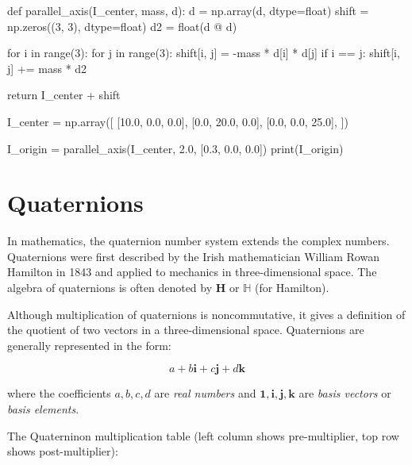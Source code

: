 \begin{python}
def parallel_axis(I_center, mass, d):
    d = np.array(d, dtype=float)
    shift = np.zeros((3, 3), dtype=float)
    d2 = float(d @ d)

    for i in range(3):
        for j in range(3):
            shift[i, j] = -mass * d[i] * d[j]
            if i == j:
                shift[i, j] += mass * d2

    return I_center + shift


I_center = np.array([
    [10.0, 0.0, 0.0],
    [0.0, 20.0, 0.0],
    [0.0, 0.0, 25.0],
])

I_origin = parallel_axis(I_center, 2.0, [0.3, 0.0, 0.0])
print(I_origin)
\end{python}

\section{Quaternions}

In mathematics, the quaternion number system extends the complex numbers.
Quaternions were first described by the Irish mathematician William Rowan
Hamilton in 1843 and applied to mechanics in three-dimensional space.
The algebra of quaternions is often denoted by $  \mathbf{H} $
or $ \mathbb{H} $ (for Hamilton).

Although multiplication of quaternions is noncommutative, it gives a definition
of the quotient of two vectors in a three-dimensional space.
Quaternions are generally represented in the form:

\begin{equation}
    a + b \mathbf{i} + c \mathbf{j} + d \mathbf{k}
\end{equation}

where the coefficients $ a, b, c, d $ are \textit{real numbers} and
$ \mathbf{1}, \mathbf{i}, \mathbf{j}, \mathbf{k} $ are \textit{basis vectors} or
\textit{basis elements}.

The Quaterninon multiplication table (left column shows pre-multiplier, top
row shows post-multiplier):

